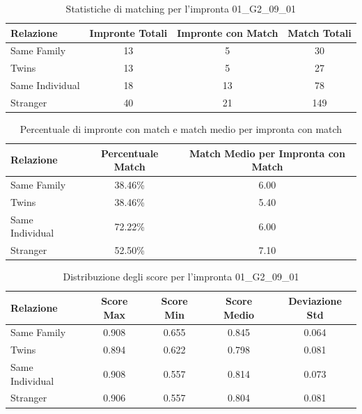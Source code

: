 \begin{table}[htbp]
\centering
\caption{Statistiche di matching per l'impronta 01\_G2\_09\_01}
\label{tab:results_01_G2_09_01}
\begin{tabular}{|l|c|c|c|}
\hline
\textbf{Relazione} & \textbf{Impronte Totali} & \textbf{Impronte con Match} & \textbf{Match Totali} \\
\hline
Same Family & 13 & 5 & 30 \\
\hline
Twins & 13 & 5 & 27 \\
\hline
Same Individual & 18 & 13 & 78 \\
\hline
Stranger & 40 & 21 & 149 \\
\hline
\end{tabular}
\end{table}


\begin{table}[htbp]
\centering
\caption{Percentuale di impronte con match e match medio per impronta con match}
\label{tab:match_percentage_01_G2_09_01}
\begin{tabular}{|l|c|c|}
\hline
\textbf{Relazione} & \textbf{Percentuale Match} & \textbf{Match Medio per Impronta con Match} \\
\hline
Same Family & 38.46\% & 6.00 \\
\hline
Twins & 38.46\% & 5.40 \\
\hline
Same Individual & 72.22\% & 6.00 \\
\hline
Stranger & 52.50\% & 7.10 \\
\hline
\end{tabular}
\end{table}


\begin{table}[htbp]
\centering
\caption{Distribuzione degli score per l'impronta 01\_G2\_09\_01}
\label{tab:scores_01_G2_09_01}
\begin{tabular}{|l|c|c|c|c|}
\hline
\textbf{Relazione} & \textbf{Score Max} & \textbf{Score Min} & \textbf{Score Medio} & \textbf{Deviazione Std} \\
\hline
Same Family & 0.908 & 0.655 & 0.845 & 0.064 \\
\hline
Twins & 0.894 & 0.622 & 0.798 & 0.081 \\
\hline
Same Individual & 0.908 & 0.557 & 0.814 & 0.073 \\
\hline
Stranger & 0.906 & 0.557 & 0.804 & 0.081 \\
\hline
\end{tabular}
\end{table}

